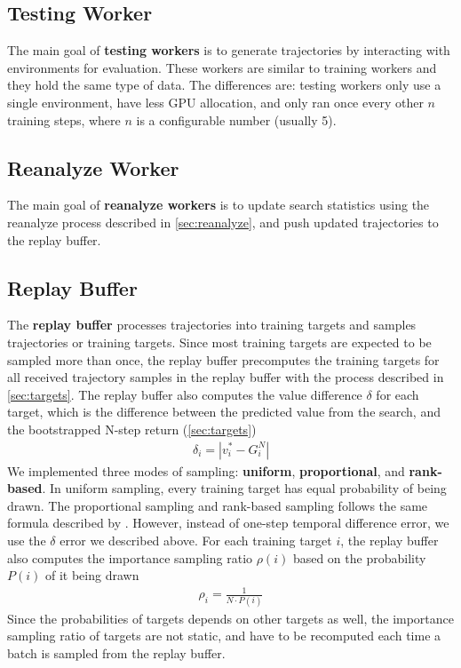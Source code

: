 \subsection{Testing Worker} \label{sec:test_rw}
The main goal of \textbf{testing workers} is to generate trajectories by interacting with environments for evaluation.
These workers are similar to training workers and they hold the same type of data.
The differences are: testing workers only use a single environment, have less GPU allocation, and only ran once every other $n$ training steps, where $n$ is a configurable number (usually 5).

\subsection{Reanalyze Worker} \label{sec:re_w}
The main goal of \textbf{reanalyze workers} is to update search statistics using the reanalyze process described in \ref{sec:reanalyze}, and push updated trajectories to the replay buffer.

\subsection{Replay Buffer} \label{sec:replay}
The \textbf{replay buffer} processes trajectories into training targets and samples trajectories or training targets.
Since most training targets are expected to be sampled more than once,
the replay buffer precomputes the training targets for all received trajectory samples in the replay buffer with the process described in \ref{sec:targets}.
The replay buffer also computes the value difference $\delta$ for each target,
which is the difference between the predicted value from the search, and the bootstrapped N-step return (\ref{sec:targets})
\begin{align*}
    \delta_i = | v^*_i - G^N_i |
\end{align*}
We implemented three modes of sampling: \textbf{uniform}, \textbf{proportional}, and \textbf{rank-based}.
In uniform sampling, every training target has equal probability of being drawn.
The proportional sampling and rank-based sampling follows the same formula described by \citeauthor{PrioritizedExperienceReplay_Schaul.Quan.ea_2016} \cite{PrioritizedExperienceReplay_Schaul.Quan.ea_2016}.
However, instead of one-step temporal difference error, we use the $\delta$ error we described above.
For each training target $i$, the replay buffer also computes the importance sampling ratio $\rho(i)$ based on the probability $P(i)$ of it being drawn
\begin{align*}
    \rho_{i}= \frac{1}{N \cdot P(i)}
\end{align*}
Since the probabilities of targets depends on other targets as well, the importance sampling ratio of targets are not static,
and have to be recomputed each time a batch is sampled from the replay buffer.

